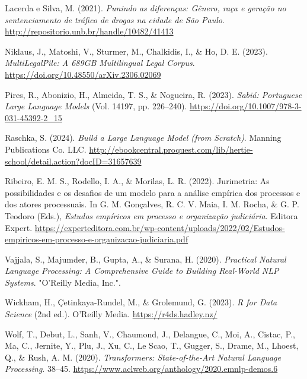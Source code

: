\documentclass[
  12pt,
  letterpaper,
]{book}
\newlength{\cslhangindent}
\newenvironment{CSLReferences}[2] %
 {\begin{list}{}{%
  \setlength{\itemindent}{0pt}
  \setlength{\leftmargin}{0pt}
  \setlength{\parsep}{0pt}
  \ifodd #1
   \setlength{\leftmargin}{\cslhangindent}
   \setlength{\itemindent}{-1\cslhangindent}
  \fi
  \setlength{\itemsep}{#2\baselineskip}}}
 {\end{list}}
\begin{document}
\begin{CSLReferences}{1}{0}
Lacerda e Silva, M. (2021). \emph{Punindo as diferenças: {Gênero}, raça
e geração no sentenciamento de tráfico de drogas na cidade de {São}
{Paulo}}. \url{http://repositorio.unb.br/handle/10482/41413}

Niklaus, J., Matoshi, V., Sturmer, M., Chalkidis, I., \& Ho, D. E.
(2023). \emph{{MultiLegalPile}: {A} {689GB} {Multilingual} {Legal}
{Corpus}}. \url{https://doi.org/10.48550/arXiv.2306.02069}

Pires, R., Abonizio, H., Almeida, T. S., \& Nogueira, R. (2023).
\emph{Sabiá: {Portuguese} {Large} {Language} {Models}} (Vol. 14197, pp.
226--240). \url{https://doi.org/10.1007/978-3-031-45392-2_15}

Raschka, S. (2024). \emph{Build a {Large} {Language} {Model} (from
{Scratch})}. Manning Publications Co. LLC.
\url{http://ebookcentral.proquest.com/lib/hertie-school/detail.action?docID=31657639}

Ribeiro, E. M. S., Rodello, I. A., \& Morilas, L. R. (2022). Jurimetria:
As possibilidades e os desafios de um modelo para a análise empírica dos
processos e dos atores processuais. In G. M. Gonçalves, R. C. V. Maia,
I. M. Rocha, \& G. P. Teodoro (Eds.), \emph{Estudos empíricos em
processo e organização judiciária}. Editora Expert.
\url{https://experteditora.com.br/wp-content/uploads/2022/02/Estudos-empiricos-em-processo-e-organizacao-judiciaria.pdf}

Vajjala, S., Majumder, B., Gupta, A., \& Surana, H. (2020).
\emph{Practical {Natural} {Language} {Processing}: {A} {Comprehensive}
{Guide} to {Building} {Real}-{World} {NLP} {Systems}}. "O'Reilly Media,
Inc.".

Wickham, H., Çetinkaya-Rundel, M., \& Grolemund, G. (2023). \emph{R for
{Data} {Science}} (2nd ed.). O'Reilly Media.
\url{https://r4ds.hadley.nz/}

Wolf, T., Debut, L., Sanh, V., Chaumond, J., Delangue, C., Moi, A.,
Cistac, P., Ma, C., Jernite, Y., Plu, J., Xu, C., Le Scao, T., Gugger,
S., Drame, M., Lhoest, Q., \& Rush, A. M. (2020). \emph{Transformers:
{State}-of-the-{Art} {Natural} {Language} {Processing}}. 38--45.
\url{https://www.aclweb.org/anthology/2020.emnlp-demos.6}

\end{CSLReferences}
\end{document}
